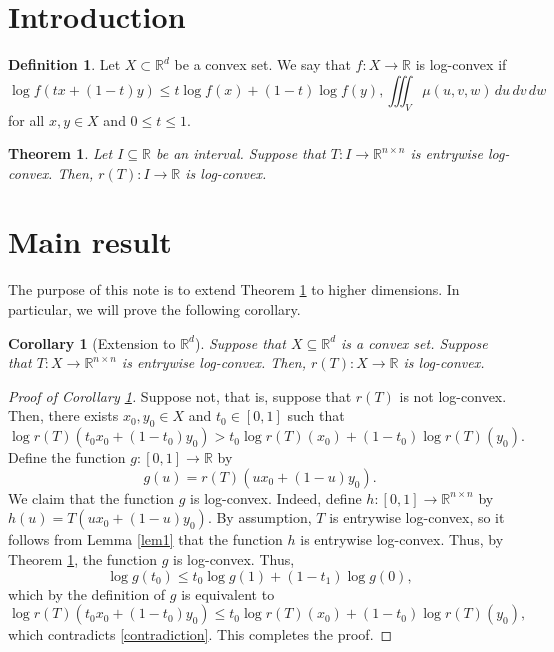 \documentclass{amsart}
\newtheorem{theorem}{Theorem}
\newtheorem{corollary}{Corollary} \newtheorem{lemma}{Lemma}
\theoremstyle{definition}
\newtheorem{definition}{Definition}
\begin{document}
\section{Introduction}


\begin{definition}
Let $X \subset \mathbb{R}^d$ be a convex set.
We say that $f : X \rightarrow \mathbb{R}$ is log-convex if
$$
\log f( t x + (1-t) y ) \le t \log f( x) + (1-t) \log f(y),


\iiint_V \mu(u,v,w) \,du\,dv\,dw
$$
for all $x,y \in X$ and $0 \le t \le 1$. 
\end{definition}

\begin{theorem} \label{thm1}
Let $I \subseteq \mathbb{R}$ be an interval. Suppose that $T : I \rightarrow \mathbb{R}^{n \times n}$ is entrywise log-convex. Then,
$r(T) : I \rightarrow \mathbb{R}$ is log-convex.
\end{theorem}

\section{Main result}

The purpose of this note is to extend Theorem \ref{thm1} to higher dimensions. In particular, we will prove the following corollary.

\begin{corollary}[Extension to $\mathbb{R}^d$] \label{cor1} Suppose that $X \subseteq \mathbb{R}^d$ is a convex set. Suppose that $T : X \rightarrow \mathbb{R}^{n \times n}$ is entrywise log-convex. Then, $r(T) : X \rightarrow \mathbb{R}$ is log-convex.
\end{corollary}

\begin{proof}[Proof of Corollary \ref{cor1}]
Suppose not, that is, suppose that $r(T)$ is not log-convex. Then, there exists
$x_0,y_0 \in X$ and $t_0 \in [0,1]$ such that
\begin{equation} \label{contradiction}
\log r(T)( t_0 x_0 + (1-t_0) y_0) > 
t_0 \log r(T)(x_0) + (1-t_0) \log r(T)(y_0).
\end{equation}
Define the function  $g : [0,1] \rightarrow \mathbb{R}$ by
$$
g(u) = r(T)(u x_0 + (1-u) y_0).
$$
We claim that the function $g$ is log-convex. Indeed, define $h : [0,1] \rightarrow \mathbb{R}^{n \times n}$ by 
$h(u) = T(u x_0 + (1-u) y_0)$. By assumption, $T$ is entrywise log-convex, so it follows from Lemma \ref{lem1} that the function $h$ is entrywise log-convex. Thus, by Theorem \ref{thm1}, the function $g$ is log-convex. Thus,
$$
\log g(t_0) \le t_0 \log g(1) + (1-t_1) \log g(0),
$$
which by the definition of $g$ is equivalent to 
$$
\log r(T)( t_0 x_0 + (1-t_0) y_0) \le  t_0 \log r(T)(x_0) + (1-t_0) \log r(T)(y_0),
$$
which contradicts \eqref{contradiction}. This completes the proof.
\end{proof}
\end{document}
